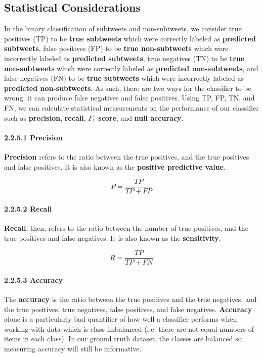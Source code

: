 \documentclass[11pt, twoside, reqno]{book}
\begin{document}
\subsection{Statistical Considerations}
\label{statistical_considerations}

In the binary classification of subtweets and non-subtweets, we consider true positives (TP) to be \textbf{true subtweets} which were correctly labeled as \textbf{predicted subtweets}, false positives (FP) to be \textbf{true non-subtweets} which were incorrectly labeled as \textbf{predicted subtweets}, true negatives (TN) to be \textbf{true non-subtweets} which were correctly labeled as \textbf{predicted non-subtweets}, and false negatives (FN) to be \textbf{true subtweets} which were incorrectly labeled as \textbf{predicted non-subtweets}. As such, there are two ways for the classifier to be wrong: it can produce false negatives and false positives. Using TP, FP, TN, and FN, we can calculate statistical measurements on the performance of our classifier such as \textbf{precision}, \textbf{recall}, \textbf{$F_{1}$ score}, and \textbf{null accuracy}.

\paragraph{2.2.5.1  Precision}
\label{precision}

\textbf{Precision} refers to the ratio between the true positives, and the true positives and false positives. It is also known as the \textbf{positive predictive value}.

\[P=\frac{TP}{TP+FP}\]

\paragraph{2.2.5.2  Recall}
\label{recall}

\textbf{Recall}, then, refers to the ratio between the number of true positives, and the true positives and false negatives. It is also known as the \textbf{sensitivity}.

\[R=\frac{TP}{TP+FN}\]

\paragraph{2.2.5.3  Accuracy}
\label{accuracy}

The \textbf{accuracy} is the ratio between the true positives and the true negatives, and the true positives, true negatives, false positives, and false negatives. \textbf{Accuracy} alone is a particularly bad quantifier of how well a classifier performs when working with data which is class-imbalanced (i.e. there are not equal numbers of items in each class). In our ground truth dataset, the classes are balanced so measuring accuracy will still be informative.
\end{document}
